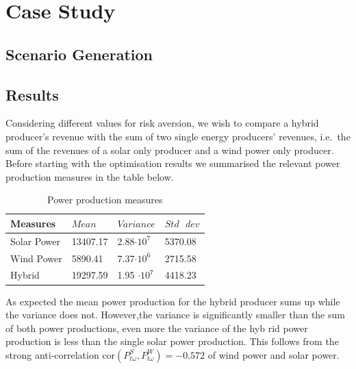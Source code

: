 \section{Case Study}

\subsection{Scenario Generation}




\subsection{Results}





Considering different values for risk aversion, we wish to compare a hybrid producer's revenue with the sum of two single energy producers' revenues, i.e.\ the sum of the revenues of a solar only producer and a wind power only producer. Before starting with the optimisation results we summarised the relevant power production measures in the table below. 


\begin{table}[h!]
	\centering
	\begin{threeparttable}
		\caption{Power production measures}
		\begin{tabular}{llll}
			\toprule
			Measures & \( Mean \) & \( Variance \) & \( Std \text{ } dev \)  \\
			\midrule
			Solar Power    & 13407.17        &  2.88$\cdot 10^7$      &  5370.08     	    \\
			Wind Power    & 5890.41     &   7.37$\cdot 10^6$      &  2715.58          	\\
			Hybrid    &  19297.59        &  1.95 $\cdot 10^7$    & 4418.23     	\\
			\bottomrule
		\end{tabular}
		
	\end{threeparttable}
\end{table}

As expected the mean power production for the hybrid producer sums up while the variance does not. However,the variance is significantly smaller than the sum of both power productions, even more the variance of the hyb
rid power production is less than the single solar power production. This follows from the strong anti-correlation $ \text{cor} (P_{t\omega}^S,P_{t\omega}^W ) = -0.572 $ of wind power and solar power.  





